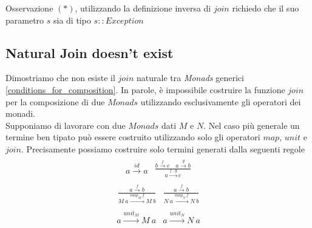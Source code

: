 Osservazione $(*)$, utilizzando la definizione inversa di $join$ richiedo che il suo
parametro $s$ sia di tipo $s::Exception$


\pagebreak
\subsection{Natural Join doesn't exist}
\label{natural_join_doesn_t_exist}
Dimostriamo che non esiste il $join$ naturale tra \textit{Monads} generici
\ref{conditions_for_composition}.
In parole, è impossibile costruire la funzione $join$ per la composizione di due
$Monads$ utilizzando esclusivamente gli operatori dei monadi.\\
Supponiamo di lavorare con due $Monads$ dati $M$ e $N$.
Nel caso più generale un termine ben tipato può essere costruito utilizzando
solo gli operatori $map$, $unit$ e $join$.
Precisamente possiamo costruire solo termini generati dalla seguenti regole
\begin{align*}
  \begin{split}
    a \overset{id}{\longrightarrow} a
  \end{split}
    \begin{split}
      \frac
        {b \overset{f}{\longrightarrow} c\quad a \overset{g}{\longrightarrow} b}
        {a \overset{f\ .\ g}{\longrightarrow} c}
    \end{split}
\end{align*}
\begin{align*}
  \begin{split}
    \frac
      {a \overset{f}{\longrightarrow} b}
      {M\ a \overset{map_M\ f}{\longrightarrow} M\ b}
  \end{split}
  \begin{split}
    \frac
      {a \overset{f}{\longrightarrow} b}
      {N\ a \overset{map_N\ f}{\longrightarrow} N\ b}
  \end{split}
\end{align*}
\begin{align*}
  \begin{split}
    a \overset{unit_M}{\longrightarrow} M\ a
  \end{split}
  \begin{split}
    a \overset{unit_N}{\longrightarrow} N\ a
  \end{split}
\end{align*}
